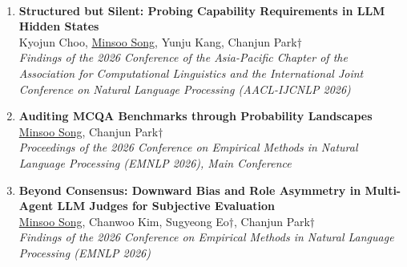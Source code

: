 \documentclass[10pt,a4paper]{article}
\begin{document}
\vspace{0.6em}
\par\vspace{0.4em}
\\[-0.6em]
\noindent{\color{gray}\rule{\linewidth}{0.4pt}}
\begin{enumerate}
    \item \small{\textbf{Structured but Silent: Probing Capability Requirements in LLM Hidden States} \\
    Kyojun Choo, \underline{Minsoo Song}, Yunju Kang, Chanjun Park$\dagger$ \\
    \textit{Findings of the 2026 Conference of the Asia-Pacific Chapter of the Association for Computational Linguistics and the International Joint Conference on Natural Language Processing (AACL-IJCNLP 2026)}}

    \item \small{\textbf{Auditing MCQA Benchmarks through Probability Landscapes} \\
    \underline{Minsoo Song}, Chanjun Park$\dagger$ \\
    \textit{Proceedings of the 2026 Conference on Empirical Methods in Natural Language Processing (EMNLP 2026), Main Conference}}

    \item \small{\textbf{Beyond Consensus: Downward Bias and Role Asymmetry in Multi-Agent LLM Judges for Subjective Evaluation} \\
    \underline{Minsoo Song}, Chanwoo Kim, Sugyeong Eo$\dagger$, Chanjun Park$\dagger$ \\
    \textit{Findings of the 2026 Conference on Empirical Methods in Natural Language Processing (EMNLP 2026)}}
\end{enumerate}
\end{document}
